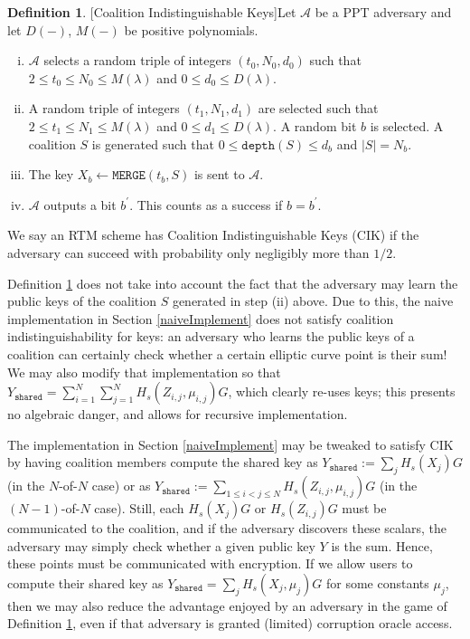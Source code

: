 \documentclass[12pt,english,oneside]{mrl}
\theoremstyle{definition}
\newtheorem{Defn}[lem]{Definition}
\newenvironment{defn}{\begin{Defn}\rm}{\end{Defn}}
\numberwithin{equation}{section}
\numberwithin{figure}{section}
\numberwithin{equation}{section}
\numberwithin{equation}{section}
\numberwithin{figure}{section}
\begin{document}
\begin{defn}[Coalition Indistinguishable Keys]\label{threshIndist} Let $\mathcal{A}$ be a PPT adversary and let $D(-)$, $M(-)$ be positive polynomials.
\begin{enumerate}[(i)]
\item $\mathcal{A}$ selects a random triple of integers $(t_0,N_0, d_0)$ such that $2 \leq t_0 \leq N_0 \leq M(\lambda)$ and $0 \leq d_0 \leq D(\lambda)$.
\item A random triple of integers $(t_1, N_1, d_1)$ are selected such that $2 \leq t_1 \leq N_1 \leq M(\lambda)$ and $0 \leq d_1 \leq D(\lambda)$. A random bit $b$ is selected. A coalition $S$ is generated such that $0 \leq\texttt{depth}(S) \leq d_b$ and $\left|S\right|=N_b$. 
\item The key $X_{b} \leftarrow \texttt{MERGE}(t_{b}, S)$ is sent to $\mathcal{A}$.
\item $\mathcal{A}$ outputs a bit $b^{\prime}$. This counts as a success if $b=b^{\prime}$.
\end{enumerate}
We say an RTM scheme has Coalition Indistinguishable Keys (CIK) if the adversary can succeed with probability only negligibly more than $1/2$.
\end{defn}

Definition \ref{threshIndist} does not take into account the fact that the adversary may learn the public keys of the coalition $S$ generated in step (ii) above. Due to this, the naive implementation in Section \ref{naiveImplement} does not satisfy coalition indistinguishability for keys: an adversary who learns the public keys of a coalition can certainly check whether a certain elliptic curve point is their sum!  We may also modify that implementation so that $Y_{\texttt{shared}} = \sum_{i=1}^{N} \sum_{j=1}^{N} H_s(Z_{i,j}, \mu_{i,j})G$, which clearly re-uses keys; this presents no algebraic danger, and allows for recursive implementation.

The implementation in Section \ref{naiveImplement} may be tweaked to satisfy CIK by having coalition members compute the shared key as $Y_{\texttt{shared}} := \sum_j H_s(X_j)G$ (in the $N$-of-$N$ case) or as $Y_{\texttt{shared}} := \sum_{1 \leq i < j \leq N} H_s(Z_{i,j}, \mu_{i,j})G$ (in the $(N-1)$-of-$N$ case). Still, each $H_s(X_j)G$ or $H_s(Z_{i,j})G$ must be communicated to the coalition, and if the adversary discovers these scalars, the adversary may simply check whether a given public key $Y$ is the sum. Hence, these points must be communicated with encryption. If we allow users to compute their shared key as $Y_{\texttt{shared}} = \sum_j H_s(X_j, \mu_j) G$ for some constants $\mu_j$, then we may also reduce the advantage enjoyed by an adversary in the game of Definition \ref{threshIndist}, even if that adversary is granted (limited) corruption oracle access. 
\end{document}

